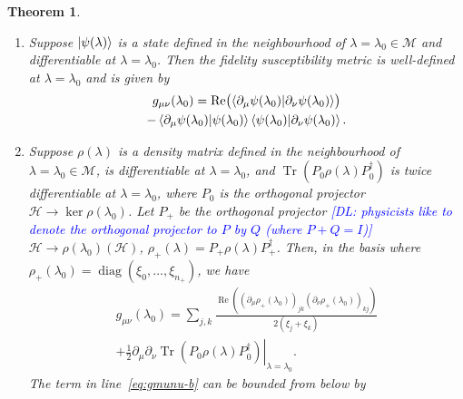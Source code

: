 \documentclass[american,aps,pra,reprint,floatfix,nofootinbib,superscriptaddress]{revtex4-2}
\DeclareMathOperator{\Tr}{Tr}
\DeclareMathOperator{\real}{Re}
\DeclareMathOperator{\diag}{diag}
\newtheorem{theorem}{Theorem}
\newcommand{\bes} {\begin{subequations}}
\newcommand{\ees} {\end{subequations}}
\newcommand{\DL}[1]{\textcolor{blue}{[DL: #1]}}
\begin{document}
\begin{theorem}
  \label{th:def.g}
  \begin{enumerate}
    \item Suppose $\ket{\psi(\lambda)}$ is a state defined in the
      neighbourhood of
      $\lambda = \lambda_0 \in \mathcal{M}$ and differentiable at
      $\lambda=\lambda_0$.  Then the fidelity susceptibility metric
      is well-defined at
      $\lambda=\lambda_0$ and is given by
      \begin{multline}
        \label{eq:gmunu.pure}
        g_{\mu\nu}(\lambda_0) = \real\bigl(\braket{\partial_\mu \psi(\lambda_0)
          | \partial_\nu \psi(\lambda_0)}\bigr)\\
        - \braket{\partial_\mu \psi(\lambda_0) | \psi(\lambda_0)}
          \braket{\psi(\lambda_0) | \partial_\nu \psi(\lambda_0)}.
      \end{multline}
    \item Suppose $\rho(\lambda)$ is a density matrix defined in the
      neighbourhood of $\lambda = \lambda_0 \in \mathcal{M}$, 
      is differentiable at $\lambda = \lambda_0$, and $\Tr(P_0 \rho(\lambda) P_0^{\dagger})$
      is twice differentiable
      at $\lambda = \lambda_0$, where $P_0$ is the orthogonal
      projector $\mathcal{H} \to \ker\rho(\lambda_0)$.
      Let $P_{{+}}$ be the orthogonal projector \DL{physicists like to denote the orthogonal projector to $P$ by $Q$ (where $P+Q=I$)}
      $\mathcal{H} \to \rho(\lambda_0)(\mathcal{H})$,
      $\rho_{+}(\lambda) = P_{{+}} \rho(\lambda) P_{{+}}^{\dagger}$.
      Then, in the basis where
      $\rho_{+}(\lambda_0) = \diag(\xi_0,\dots,\xi_{n_{+}})$,
      we have
      \bes
      \label{eq:gmunu}
        \begin{align}
      \label{eq:gmunu-a}
      g_{\mu\nu}(\lambda_0)
        = \sum_{j,k} \frac{
            \real\left(
              (\partial_\mu\rho_{+}(\lambda_0))_{jk}
              (\partial_\nu\rho_{+}(\lambda_0))_{kj}
            \right)
          }{2(\xi_j + \xi_k)}\\
     \label{eq:gmunu-b}
         + \frac12 \left.\partial_\mu \partial_\nu \Tr(P_0 \rho(\lambda) P_0^{\dagger})
          \right|_{\lambda=\lambda_0}.
      \end{align}
      \ees
      The term in line~\eqref{eq:gmunu-b} can be bounded from below by

\end{enumerate}
\end{theorem}
\end{document}
